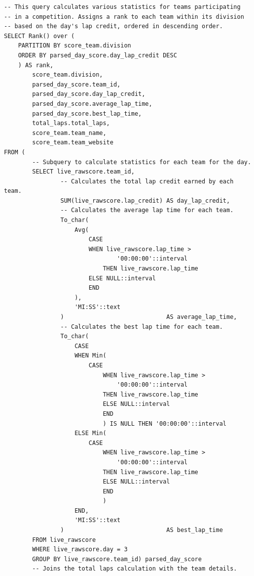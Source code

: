 \documentclass[11pt]{article}
\begin{document}
\begin{lstlisting}[style=sql, caption={Live Score Query for day 3}, label={lst:sql_live_scoring_query}]
-- This query calculates various statistics for teams participating
-- in a competition. Assigns a rank to each team within its division
-- based on the day's lap credit, ordered in descending order.
SELECT Rank() over (
    PARTITION BY score_team.division
    ORDER BY parsed_day_score.day_lap_credit DESC
    ) AS rank,
        score_team.division,
        parsed_day_score.team_id,
        parsed_day_score.day_lap_credit,
        parsed_day_score.average_lap_time,
        parsed_day_score.best_lap_time,
        total_laps.total_laps,
        score_team.team_name,
        score_team.team_website
FROM (
        -- Subquery to calculate statistics for each team for the day.
        SELECT live_rawscore.team_id,
                -- Calculates the total lap credit earned by each team.
                SUM(live_rawscore.lap_credit) AS day_lap_credit,
                -- Calculates the average lap time for each team.
                To_char(
                    Avg(
                        CASE
                        WHEN live_rawscore.lap_time >
                                '00:00:00'::interval
                            THEN live_rawscore.lap_time
                        ELSE NULL::interval
                        END
                    ),
                    'MI:SS'::text
                )                             AS average_lap_time,
                -- Calculates the best lap time for each team.
                To_char(
                    CASE
                    WHEN Min(
                        CASE
                            WHEN live_rawscore.lap_time >
                                '00:00:00'::interval
                            THEN live_rawscore.lap_time
                            ELSE NULL::interval
                            END
                            ) IS NULL THEN '00:00:00'::interval
                    ELSE Min(
                        CASE
                            WHEN live_rawscore.lap_time >
                                '00:00:00'::interval
                            THEN live_rawscore.lap_time
                            ELSE NULL::interval
                            END
                            )
                    END,
                    'MI:SS'::text
                )                             AS best_lap_time
        FROM live_rawscore
        WHERE live_rawscore.day = 3
        GROUP BY live_rawscore.team_id) parsed_day_score
        -- Joins the total laps calculation with the team details.

\end{lstlisting}
\end{document}
